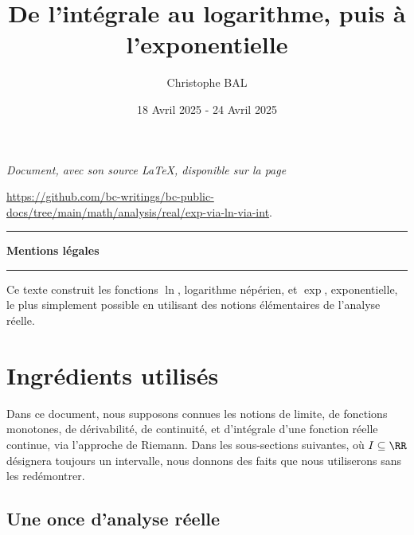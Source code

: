 \documentclass[12pt]{amsart}
\begin{document}
\title{De l'intégrale au logarithme, puis à l'exponentielle}
\author{Christophe BAL}
\date{18 Avril 2025 - 24 Avril 2025}

\maketitle

\begin{center}
	\itshape
	Document, avec son source \LaTeX, disponible sur la page

	\url{https://github.com/bc-writings/bc-public-docs/tree/main/math/analysis/real/exp-via-ln-via-int}.
\end{center}


\bigskip


\begin{center}
	\hrule\vspace{.3em}
	{
		\fontsize{1.35em}{1em}\selectfont
		\textbf{Mentions \og légales \fg}
	}

	\vspace{0.45em}
	\doclicenseThis
	\hrule
\end{center}


\bigskip


\setcounter{tocdepth}{2}
\tableofcontents




\newpage

\begin{meta-abstract*}
	Ce texte construit les fonctions $\ln$, logarithme népérien, et $\exp$, exponentielle, le plus simplement possible en utilisant des notions élémentaires de l'analyse réelle.
\end{meta-abstract*}




\section{Ingrédients utilisés}

Dans ce document,
nous supposons connues les notions
de limite,
de fonctions monotones,
de dérivabilité,
de continuité,
et
d'intégrale d'une fonction réelle continue, via l'approche de Riemann.
%
Dans les sous-sections suivantes, où $I \subseteq \RR$ désignera toujours un intervalle, nous donnons des faits que nous utiliserons sans les redémontrer.


	\subsection{Une once d'analyse réelle}
\end{document}
